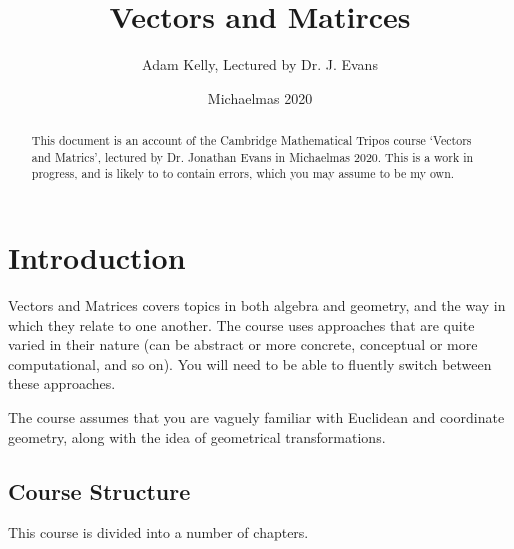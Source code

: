 \documentclass[a4]{scrartcl}
\title{Vectors and Matirces}
\author{Adam Kelly, Lectured by Dr. J. Evans}
\date{Michaelmas 2020}
\begin{document}
\maketitle

\begin{abstract}
	This document is an account of the Cambridge Mathematical Tripos course `Vectors and Matrics', lectured by Dr. Jonathan Evans in Michaelmas 2020.
	This is a work in progress, and is likely to to contain errors, which you may assume to be my own.
\end{abstract}

\tableofcontents

\clearpage

\section{Introduction}

Vectors and Matrices covers topics in both algebra and geometry, and the way in which they relate to one another. The course uses approaches that are quite varied in their nature (can be abstract or more concrete, conceptual or more computational, and so on). You will need to be able to fluently switch between these approaches.

The course assumes that you are vaguely familiar with Euclidean and coordinate geometry, along with the idea of geometrical transformations.

\subsection{Course Structure}

This course is divided into a number of chapters.
\end{document}
